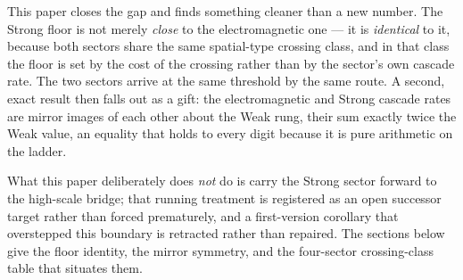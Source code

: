 \documentclass[12pt, a4paper]{article}
\renewcommand{\epsEM}{\varepsilon_{\rm EM}}
\begin{document}
This paper closes the gap and finds something cleaner than a new number. The
Strong floor is not merely \emph{close} to the electromagnetic one --- it is
\emph{identical} to it, because both sectors share the same spatial-type
crossing class, and in that class the floor is set by the cost of the crossing
rather than by the sector's own cascade rate. The two sectors arrive at the
same threshold by the same route. A second, exact result then falls out as a
gift: the electromagnetic and Strong cascade rates are mirror images of each
other about the Weak rung, their sum exactly twice the Weak value, an equality
that holds to every digit because it is pure arithmetic on the ladder.

What this paper deliberately does \emph{not} do is carry the Strong sector
forward to the high-scale bridge; that running treatment is registered as an
open successor target rather than forced prematurely, and a first-version
corollary that overstepped this boundary is retracted rather than repaired.
The sections below give the floor identity, the mirror symmetry, and the
four-sector crossing-class table that situates them.

\sloppy



\begin{abstract}
\sloppy
The Strong sector instability floor has remained implicit since
ZC30. This paper makes it explicit and derives two exact results
from existing pillars.

\textbf{THM-ZC81-01} (Strong Floor Identity, Exact): the Strong
and EM sectors share the same instability floor,
\[
  \epsS \;=\; \epsEM \;=\;
  \epsuniv\!\left(\frac{C_{\rm EM}}{C_W}\right)^{1/4} = 0.007494.
\]
The origin is the spatial-type crossing class of FIND-ZC30-02:
both sectors have $\TRone = (d_s/n_m)\,\epsuniv^2$, so the
floor is determined by the crossing cost, not the Born-chain rate.

\textbf{FIND-ZC81-01} (Ladder Mirror Symmetry, Exact, Gift): the
EM and Strong sector rates are mirror images around the Weak rung,
\[
  \GammaEM + \GammaS \;=\; 2\,\GammaW.
\]
Gap: $0.0000000000\%$. Pure arithmetic from THM-ZC73-01.

\textbf{COR-ZC81-01}: the spatial-type class theorem --- $\TRone$
values for all four sectors in one table. \textbf{GAP-ZC81-01}
registers the Strong sector running bridge $R_0\to R_{\max}$ as
the successor target. (\textbf{COR-ZC81-02} of v1 retracted; see
PM-ZC81-RETRACT-01.)
\end{abstract}
\end{document}
